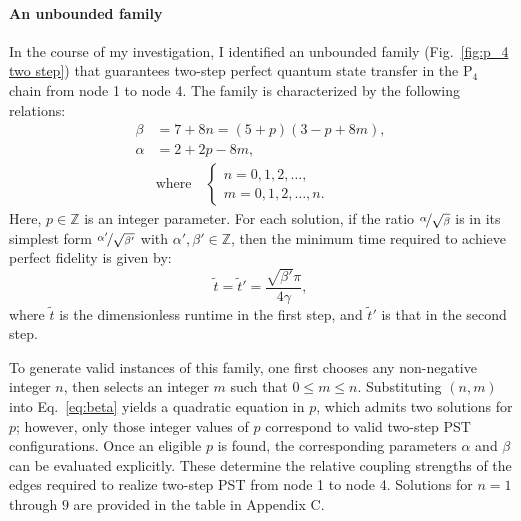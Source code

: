 \documentclass[reprint, aps, 12pt, floatfix]{revtex4-2}
\begin{document}
\paragraph{An unbounded family}
In the course of my investigation, I identified an unbounded family (Fig.~\ref{fig:p_4 two step}) that guarantees two-step perfect quantum state transfer in the P$_4$ chain from node 1 to node 4. The family is characterized by the following relations:
\begin{align}
    \label{eq:beta}
    \beta &= 7 + 8n = (5 + p)(3 - p + 8m), \\
    \alpha &= 2 + 2p - 8m, \\
    &\text{where} \quad 
    \begin{cases}
        n = 0,1,2,\dots, \\
        m = 0,1,2,\dots,n.
    \end{cases} \nonumber
\end{align}
Here, $p \in \mathbb{Z}$ is an integer parameter. For each solution, if the ratio $\nicefrac{\alpha}{\sqrt{\beta}}$ is in its simplest form $\nicefrac{\alpha'}{\sqrt{\beta'}}$ with $\alpha', \beta' \in \mathbb{Z}$, then the minimum time required to achieve perfect fidelity is given by:
\begin{equation}
    \tilde{t}= \tilde{t}' = \frac{\sqrt{\beta'} \pi}{4\gamma},
\end{equation}
where $\tilde{t}$ is the dimensionless runtime in the first step, and $\tilde{t}'$ is that in the second step.

To generate valid instances of this family, one first chooses any non-negative integer $n$, then selects an integer $m$ such that $0 \leq m \leq n$. Substituting $(n, m)$ into Eq.~\ref{eq:beta} yields a quadratic equation in $p$, which admits two solutions for $p$; however, only those integer values of $p$ correspond to valid two-step PST configurations. Once an eligible $p$ is found, the corresponding parameters $\alpha$ and $\beta$ can be evaluated explicitly. These determine the relative coupling strengths of the edges required to realize two-step PST from node 1 to node 4. Solutions for $n = 1$ through $9$ are provided in the table in Appendix C.
\end{document}
